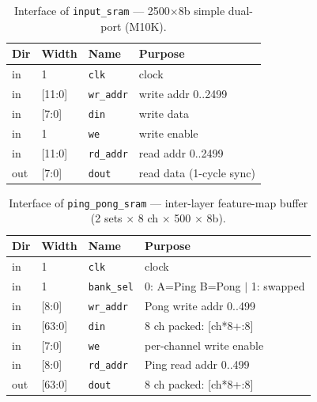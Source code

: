 
\begin{table}[t]
\centering
\caption{Interface of \texttt{input\_sram} — 2500$\times$8b simple dual-port (M10K).}
\label{tab:if-input-sram}
\small
\setlength{\tabcolsep}{4pt}
\renewcommand{\arraystretch}{1.1}
\begin{tabular}{@{}llll@{}}
\toprule
\textbf{Dir} & \textbf{Width} & \textbf{Name} & \textbf{Purpose} \\
\midrule
in  & 1      & \texttt{clk}      & clock \\
in  & [11:0] & \texttt{wr\_addr} & write addr 0..2499 \\
in  & [7:0]  & \texttt{din}      & write data \\
in  & 1      & \texttt{we}       & write enable \\
in  & [11:0] & \texttt{rd\_addr} & read addr 0..2499 \\
out & [7:0]  & \texttt{dout}     & read data (1-cycle sync) \\
\bottomrule
\end{tabular}
\end{table}

\begin{table}[t]
\centering
\caption{Interface of \texttt{ping\_pong\_sram} — inter-layer feature-map buffer
(2 sets $\times$ 8 ch $\times$ 500 $\times$ 8b).}
\label{tab:if-pingpong}
\small
\setlength{\tabcolsep}{4pt}
\renewcommand{\arraystretch}{1.1}
\begin{tabular}{@{}llll@{}}
\toprule
\textbf{Dir} & \textbf{Width} & \textbf{Name} & \textbf{Purpose} \\
\midrule
in  & 1      & \texttt{clk}      & clock \\
in  & 1      & \texttt{bank\_sel}& 0: A=Ping B=Pong $\mid$ 1: swapped \\
in  & [8:0]  & \texttt{wr\_addr} & Pong write addr 0..499 \\
in  & [63:0] & \texttt{din}      & 8 ch packed: [ch*8+:8] \\
in  & [7:0]  & \texttt{we}       & per-channel write enable \\
in  & [8:0]  & \texttt{rd\_addr} & Ping read addr 0..499 \\
out & [63:0] & \texttt{dout}     & 8 ch packed: [ch*8+:8] \\
\bottomrule
\end{tabular}
\end{table}

